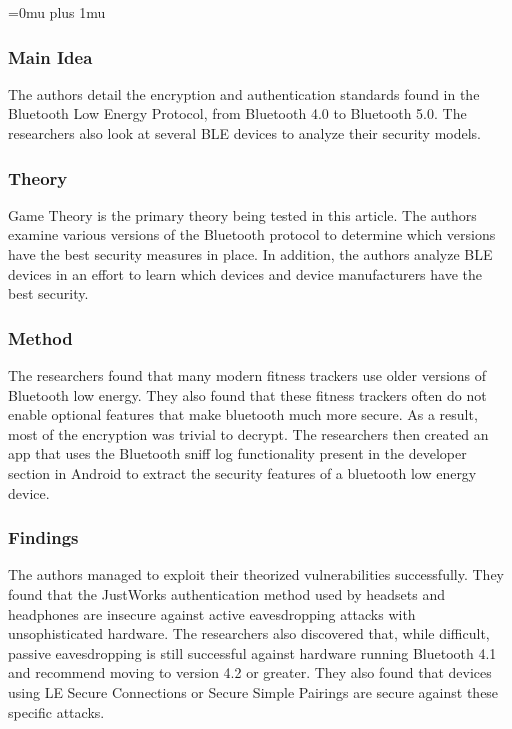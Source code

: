 \Urlmuskip=0mu plus 1mu\relax
{}

\subsubsection{Main Idea}

\noindent
The authors detail the encryption and authentication standards found in the Bluetooth Low Energy Protocol, from Bluetooth 4.0 to Bluetooth 5.0.  The researchers also look at several BLE devices to analyze their security models.

\subsubsection{Theory}

\noindent
Game Theory is the primary theory being tested in this article.  The authors examine various versions of the Bluetooth protocol to determine which versions have the best security measures in place.  In addition, the authors analyze BLE devices in an effort to learn which devices and device manufacturers have the best security.

\subsubsection{Method}

\noindent
The researchers found that many modern fitness trackers use older versions of Bluetooth low energy.  They also found that these fitness trackers often do not enable optional features that make bluetooth much more secure.  As a result, most of the encryption was trivial to decrypt.  The researchers then created an app that uses the Bluetooth sniff log functionality present in the developer section in Android to extract the security features of a bluetooth low energy device.

\subsubsection{Findings}

\noindent
The authors managed to exploit their theorized vulnerabilities successfully.  They found that the JustWorks authentication method used by headsets and headphones are insecure against active eavesdropping attacks with unsophisticated hardware.  The researchers also discovered that, while difficult, passive eavesdropping is still successful against hardware running Bluetooth 4.1 and recommend moving to version 4.2 or greater.  They also found that devices using LE Secure Connections or Secure Simple Pairings are secure against these specific attacks.

